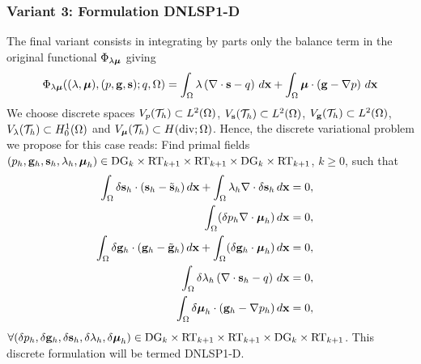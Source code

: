 \subsubsection{Variant 3: Formulation DNLSP1-D}

The final variant consists in integrating by parts only the balance term in 
the original functional $\Phi_{\lambda \boldsymbol{\mu}}$ giving
\begin{multline}
\Phi_{\lambda \boldsymbol{\mu}}((\lambda, \boldsymbol{\mu}), (p, \mathbf{g}, \mathbf{s}); q, \Omega) = 
 \int_{\Omega}  \lambda \left ( \nabla \cdot \mathbf{s} - q \right ) \, d\mathbf{x} + 
\int_{\Omega} \boldsymbol{\mu} \cdot \left ( \mathbf{g} - \nabla {p} \right )\,d\mathbf{x}   \label{eq:Phi5D}
\end{multline}
We choose discrete spaces 
$V_{p}(\mathcal{T}_h) \subset L^2(\Omega)$, $V_{\mathbf{s}}(\mathcal{T}_h) \subset L^2(\Omega)$, $V_{\mathbf{g}}(\mathcal{T}_h) \subset L^2(\Omega)$, $V_{\lambda}(\mathcal{T}_h) \subset H^1_0(\Omega)$
and $V_{\boldsymbol{\mu}}(\mathcal{T}_h) \subset H(\text{div};\Omega)$.
Hence, the discrete variational problem we propose for this case reads:
Find primal fields
$(p_h,\mathbf{g}_h, \mathbf{s}_h, \lambda_h, \boldsymbol{\mu}_h ) \in \text{DG}_{k} \times \text{RT}_{k+1} \times \text{RT}_{k+1}
\times \text{DG}_{k} \times \text{RT}_{k+1}$, $k \ge 0$, such that
\begin{equation}
        \begin{aligned}
                \int_{\Omega}  \delta \mathbf{s}_h \cdot (\mathbf{s}_h - \tilde{\mathbf{s}}_h) \, d\mathbf{x} +
              \int_{\Omega} {\lambda_h \nabla \cdot \delta \mathbf{s}_h } \, d\mathbf{x} & = 0, & \\
              \int_{\Omega}(\delta p_h \nabla \cdot \boldsymbol{\mu}_h  ) \, d\mathbf{x} & = 0, &\\
              \int_{\Omega}  \delta \mathbf{g}_h \cdot (\mathbf{g}_h - \tilde{\mathbf{g}}_h) \, d\mathbf{x}  + \int_{\Omega} (\delta \mathbf{g}_h \cdot \boldsymbol{\mu}_h) \, d\mathbf{x} & = 0, &\\
	      \int_{\Omega} \delta \lambda_h \left ( \nabla \cdot  \mathbf{s}_h  -  q \right ) \, d\mathbf{x} & = 0, & \\
               \int_{\Omega} \delta \boldsymbol{\mu}_h \cdot (\mathbf{g}_h -  \nabla p_h) \, d\mathbf{x} & = 0, &
        \end{aligned}
\end{equation}
$\forall (\delta p_h,\delta\mathbf{g}_h, \delta\mathbf{s}_h, \delta\lambda_h, \delta\boldsymbol{\mu}_h ) \in  \text{DG}_{k} \times \text{RT}_{k+1} \times \text{RT}_{k+1}
\times \text{DG}_{k} \times \text{RT}_{k+1}$.
This discrete formulation will be termed DNLSP1-D. 


